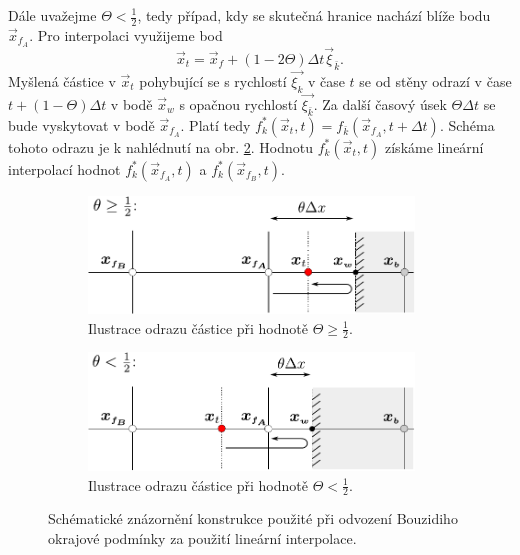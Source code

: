 Dále uvažejme $ \Theta < \frac{1}{2} $, tedy případ, kdy se skutečná hranice nachází blíže bodu $ \vec{x}_{f_A} $. Pro interpolaci využijeme bod
\begin{equation}
\vec{x}_t = \vec{x}_f + (1 - 2\Theta)\Delta t \vec{\xi}_{\bar{k}}.
\end{equation}
Myšlená částice v $ \vec{x}_{t} $ pohybující se s rychlostí $ \vec{\xi_{k}} $ v čase $ t $ se od stěny odrazí v čase $ t + (1 - \Theta) \Delta t$ v bodě $ \vec{x}_w $ s opačnou rychlostí $ \vec{\xi_{\bar{k}}} $. Za další časový úsek $ \Theta \Delta t $ se bude vyskytovat v bodě $ \vec{x}_{f{_A}} $. Platí tedy $ f^{*}_{k} (\vec{x}_t, t) = f_{\bar{k}} (\vec{x}_{f{_A}}, t + \Delta t)$. Schéma tohoto odrazu je k nahlédnutí na obr. \ref{fig:interp2}. Hodnotu $ f^{*}_{k} (\vec{x}_t, t) $ získáme lineární interpolací hodnot $ f^{*}_{k} (\vec{x}_{f_A}, t) $ a $ f^{*}_{k} (\vec{x}_{f_B}, t) $.
\begin{figure}[H]
	\centering
	\begin{subfigure}{0.5\textwidth}
		\centering
		\includegraphics[width=0.95\textwidth]{Images/interpolace1.pdf}
		\vspace{2mm}
		\caption{Ilustrace odrazu částice při hodnotě $ \Theta \geq \frac{1}{2} $.}
		\label{fig:interp1}
	\end{subfigure}%
	\begin{subfigure}{0.5\textwidth}
		\centering
		\includegraphics[width=0.95\textwidth]{Images/interpolace2.pdf}
		\vspace{2mm}
		\caption{Ilustrace odrazu částice při hodnotě $ \Theta < \frac{1}{2} $.}
		\label{fig:interp2}
	\end{subfigure}
	\caption{Schématické znázornění konstrukce použité při odvození Bouzidiho okrajové podmínky za použití lineární interpolace.}
	\label{fig:interp}
\end{figure}

